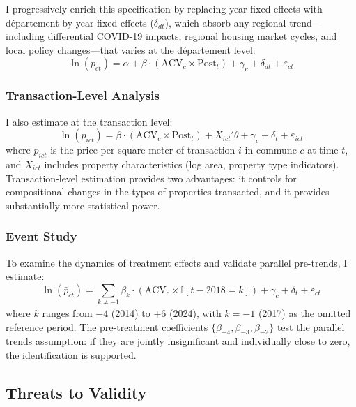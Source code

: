 \documentclass[12pt]{article}
\newcommand{\ind}{\mathbb{I}}
\begin{document}
I progressively enrich this specification by replacing year fixed effects with d\'{e}partement-by-year fixed effects ($\delta_{dt}$), which absorb any regional trend---including differential COVID-19 impacts, regional housing market cycles, and local policy changes---that varies at the d\'{e}partement level:
\begin{equation}
\ln(\bar{p}_{ct}) = \alpha + \beta \cdot (\text{ACV}_c \times \text{Post}_t) + \gamma_c + \delta_{dt} + \varepsilon_{ct}
\label{eq:depyear}
\end{equation}

\subsubsection{Transaction-Level Analysis}

I also estimate at the transaction level:
\begin{equation}
\ln(p_{ict}) = \beta \cdot (\text{ACV}_c \times \text{Post}_t) + X_{ict}'\theta + \gamma_c + \delta_t + \varepsilon_{ict}
\label{eq:trans}
\end{equation}
where $p_{ict}$ is the price per square meter of transaction $i$ in commune $c$ at time $t$, and $X_{ict}$ includes property characteristics (log area, property type indicators). Transaction-level estimation provides two advantages: it controls for compositional changes in the types of properties transacted, and it provides substantially more statistical power.

\subsubsection{Event Study}

To examine the dynamics of treatment effects and validate parallel pre-trends, I estimate:
\begin{equation}
\ln(\bar{p}_{ct}) = \sum_{k \neq -1} \beta_k \cdot (\text{ACV}_c \times \ind[t - 2018 = k]) + \gamma_c + \delta_t + \varepsilon_{ct}
\label{eq:eventstudy}
\end{equation}
where $k$ ranges from $-4$ (2014) to $+6$ (2024), with $k = -1$ (2017) as the omitted reference period. The pre-treatment coefficients $\{\beta_{-4}, \beta_{-3}, \beta_{-2}\}$ test the parallel trends assumption: if they are jointly insignificant and individually close to zero, the identification is supported.

\subsection{Threats to Validity}
\end{document}
